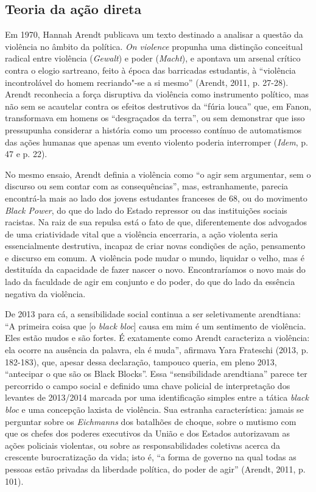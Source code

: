 \subsection{Teoria da ação direta}

Em 1970, Hannah Arendt publicava um
texto destinado a analisar a questão da violência no âmbito da política.
\emph{On violence} propunha uma distinção conceitual radical entre
violência (\emph{Gewalt}) e poder (\emph{Macht}), e apontava um arsenal
crítico contra o elogio sartreano, feito à época das barricadas
estudantis, à ``violência incontrolável do homem recriando"-se a si
mesmo'' (Arendt, 2011, p. 27-28). Arendt reconhecia a força disruptiva
da violência como instrumento político, mas não sem se acautelar contra
os efeitos destrutivos da ``fúria louca'' que, em Fanon, transformava em
homens os ``desgraçados da terra'', ou sem demonstrar que isso
pressupunha considerar a história como um processo contínuo de
automatismos das ações humanas que apenas um evento violento poderia
interromper (\emph{Idem}, p. 47 e p. 22).

No mesmo ensaio, Arendt definia a violência como ``o agir sem
argumentar, sem o discurso ou sem contar com as consequências'', mas,
estranhamente, parecia encontrá-la mais ao lado dos jovens estudantes
franceses de 68, ou do movimento \emph{Black Power}, do que do lado do
Estado repressor ou das instituições sociais racistas. Na raiz de sua
repulsa está o fato de que, diferentemente dos advogados de uma
criatividade vital que a violência encerraria, a ação violenta seria
essencialmente destrutiva, incapaz de criar novas condições de ação,
pensamento e discurso em comum. A violência pode mudar o mundo, liquidar
o velho, mas é destituída da capacidade de fazer nascer o novo.
Encontraríamos o novo mais do lado da faculdade de agir em conjunto e do
poder, do que do lado da essência negativa da violência.

De 2013 para cá, a sensibilidade social continua a ser seletivamente
arendtiana: ``A primeira coisa que {[}o \emph{black bloc}{]} causa em
mim é um sentimento de violência. Eles estão mudos e são fortes. É
exatamente como Arendt caracteriza a violência: ela ocorre na ausência
da palavra, ela é muda'', afirmava Yara Frateschi (2013, p. 182-183),
que, apesar dessa declaração, tampouco queria, em pleno 2013,
``antecipar o que são os Black Blocks''. Essa ``sensibilidade
arendtiana'' parece ter percorrido o campo social e definido uma chave
policial de interpretação dos levantes de 2013/2014 marcada por uma
identificação simples entre a tática \emph{black bloc} e uma concepção
laxista de violência. Sua estranha característica: jamais se perguntar
sobre os \emph{Eichmanns }dos batalhões de choque, sobre o mutismo com
que os chefes dos poderes executivos da União e dos Estados autorizavam
as ações policiais violentas, ou sobre as responsabilidades coletivas
acerca da crescente burocratização da vida; isto é, ``a forma de governo
na qual todas as pessoas estão privadas da liberdade política, do poder
de agir'' (Arendt, 2011, p. 101).


